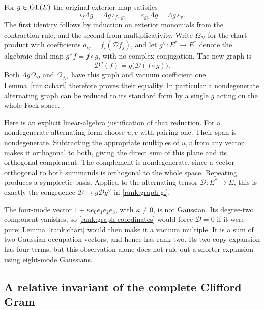 For $g\in\operatorname{GL}(E)$ the original exterior map satisfies
\begin{equation}
 \iota_f\Lambda g=\Lambda g\,\iota_{f\circ g},\qquad
 \varepsilon_{gv}\Lambda g=\Lambda g\,\varepsilon_v.
 \label{rank:gl-intertwining}
\end{equation}
The first identity follows by induction on exterior monomials from the
contraction rule, and the second from multiplicativity.
Write $\Omega_{\mathcal D}$ for the chart product with coefficients
$a_{ij}=f_i(\mathcal D f_j)$, and let $g^\vee:E^*\to E^*$ denote the
algebraic dual map $g^\vee f=f\circ g$, with no complex conjugation.
The new graph is
\begin{equation}
 \mathcal D^g(f)=g\bigl(\mathcal D(f\circ g)\bigr).
 \label{rank:graph-gl}
\end{equation}
Both $\Lambda g\Omega_{\mathcal D}$ and $\Omega_{\mathcal D^g}$ have this graph and vacuum
coefficient one. Lemma~\ref{rank:chart} therefore proves their equality.
In particular a nondegenerate alternating graph can be reduced to its
standard form by a single $g$ acting on the whole Fock space.

Here is an explicit linear-algebra justification of that reduction.
For a nondegenerate alternating form choose $u,v$ with pairing one.
Their span is nondegenerate. Subtracting the appropriate multiples of
$u,v$ from any vector makes it orthogonal to both, giving the direct sum
of this plane and its orthogonal complement. The complement is
nondegenerate, since a vector orthogonal to both summands is orthogonal
to the whole space. Repeating produces a symplectic basis. Applied to the
alternating tensor $\mathcal D:E^*\to E$, this is exactly the congruence
$\mathcal D\mapsto g\mathcal D g^\vee$ in \eqref{rank:graph-gl}.

\begin{example}\label{rank:four-mode-example}
The four-mode vector $1+\kappa e_0e_1e_2e_3$, with $\kappa\ne0$, is not
Gaussian. Its degree-two component vanishes, so
\eqref{rank:graph-coordinates} would force $\mathcal D=0$ if it were pure;
Lemma~\ref{rank:chart} would then make it a vacuum multiple. It is a sum
of two Gaussian occupation vectors, and hence has rank two.
Its two-copy expansion has four terms, but this observation alone does
not rule out a shorter expansion using eight-mode Gaussians.
\end{example}

\subsection{A relative invariant of the complete Clifford Gram}

